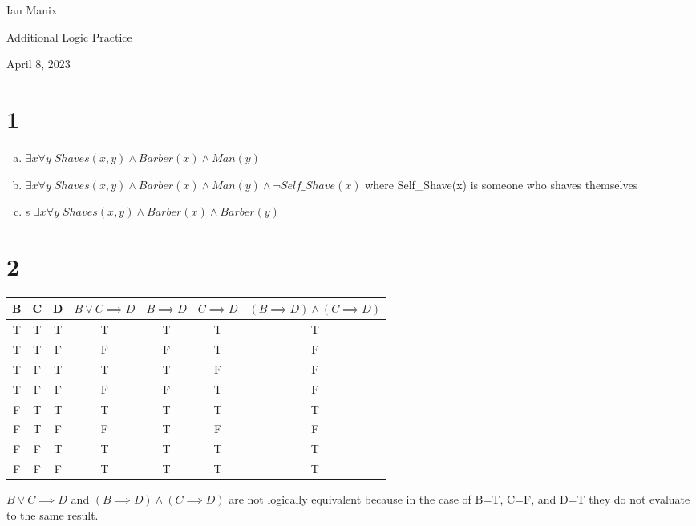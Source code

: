 \documentclass{article}
\begin{document}
    \begin{FlushLeft}
        Ian Manix

        Additional Logic Practice

        April 8, 2023
    \end{FlushLeft}

    \section*{1}

    \begin{enumerate}[a)]
      
        \item $\exists{x}\forall{y}\; Shaves(x,y) \land Barber(x) \land Man(y)$
        \item $\exists{x}\forall{y}\; Shaves(x,y) \land Barber(x) \land Man(y) \land \neg Self\_Shave(x)$ where Self\_Shave(x) is someone who shaves themselves
        \item s $\exists{x} \forall{y}\; Shaves(x,y) \land Barber(x) \land Barber(y)$

    \end{enumerate}


    \section*{2}

    \begin{center}
    \begin{tabular} {| c | c | c | c | c | c | c |}
        \hline
        B & C & D & $B \lor C \implies D$ & $B \implies D$ & $C \implies D$ & $(B \implies D) \land (C \implies D)$ \\
        \hline
        T & T & T & T & T & T & T \\
        \hline
        T & T & F & F & F & T & F \\
        \hline
        T & F & T & T & T & F & F \\
        \hline
        T & F & F & F & F & T & F \\
        \hline
        F & T & T & T & T & T & T \\
        \hline
        F & T & F & F & T & F & F \\
        \hline
        F & F & T & T & T & T & T \\
        \hline
        F & F & F & T & T & T & T \\
        \hline
    \end{tabular}
    \end{center}
    $B \lor C \implies D$ and $(B \implies D) \land (C \implies D)$ are not logically equivalent because in the case of B=T, C=F, and D=T they do not evaluate to the same result. 
\end{document}

